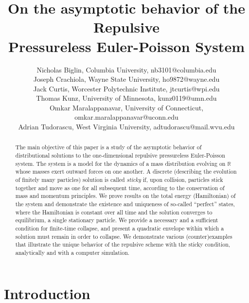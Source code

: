 \documentclass[11pt]{article}
\numberwithin{equation}{section}
\begin{document}
\title{On the asymptotic behavior of the Repulsive \\ Pressureless Euler-Poisson System}
\author{Nicholas Biglin, Columbia University, nb3101@columbia.edu \\ Joseph Crachiola, Wayne State University, ho9872@wayne.edu\\ Jack Curtis, Worcester Polytechnic Institute, jtcurtis@wpi.edu \\ Thomas Kunz, University of Minnesota, kunz0119@umn.edu \\Omkar Maralappanavar, University of Connecticut, omkar.maralappanavar@uconn.edu\\ Adrian Tudorascu, West Virginia University, adtudorascu@mail.wvu.edu}

\maketitle
\begin{abstract}
    The main objective of this paper is a study of the asymptotic behavior of distributional solutions to the one-dimensional repulsive pressureless Euler-Poisson system.
    The system is a model for the dynamics of a mass distribution evolving on $\mathbb R$ whose masses exert outward forces on one another. A discrete (describing the evolution of finitely many particles) solution is called \textit{sticky} if, upon collision, particles stick together and move as one for all subsequent time, according to the conservation of mass and momentum principles.
    We prove results on the total energy (Hamiltonian) of the system and demonstrate the existence and uniqueness of so-called ``perfect'' states, where the Hamiltonian is constant over all time and the solution converges to equilibrium,  a single stationary particle. We provide a necessary and a sufficient condition for finite-time collapse, and present a quadratic envelope within which a solution must remain in order to collapse. We demonstrate various (counter)examples that illustrate the unique behavior of the repulsive scheme with the sticky condition, analytically and with a computer simulation. 
\end{abstract}

\doublespacing
\section{Introduction}
\end{document}
